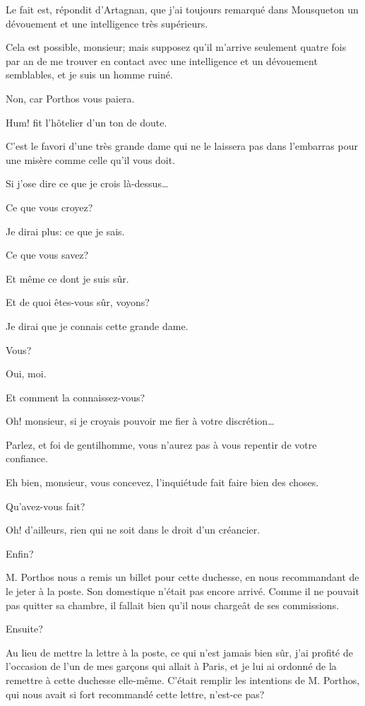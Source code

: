 \speak  Le fait est, répondit d'Artagnan, que j'ai toujours remarqué dans Mousqueton un dévouement et une intelligence très supérieurs. 

\speak  Cela est possible, monsieur; mais supposez qu'il m'arrive seulement quatre fois par an de me trouver en contact avec une intelligence et un dévouement semblables, et je suis un homme ruiné. 

\speak  Non, car Porthos vous paiera. 

\speak  Hum! fit l'hôtelier d'un ton de doute. 

\speak  C'est le favori d'une très grande dame qui ne le laissera pas dans l'embarras pour une misère comme celle qu'il vous doit. 

\speak  Si j'ose dire ce que je crois là-dessus\dots 

\speak  Ce que vous croyez? 

\speak  Je dirai plus: ce que je sais. 

\speak  Ce que vous savez? 

\speak  Et même ce dont je suis sûr. 

\speak  Et de quoi êtes-vous sûr, voyons? 

\speak  Je dirai que je connais cette grande dame. 

\speak  Vous? 

\speak  Oui, moi. 

\speak  Et comment la connaissez-vous? 

\speak  Oh! monsieur, si je croyais pouvoir me fier à votre discrétion\dots 

\speak  Parlez, et foi de gentilhomme, vous n'aurez pas à vous repentir de votre confiance. 

\speak  Eh bien, monsieur, vous concevez, l'inquiétude fait faire bien des choses. 

\speak  Qu'avez-vous fait? 

\speak  Oh! d'ailleurs, rien qui ne soit dans le droit d'un créancier. 

\speak  Enfin? 

\speak  M. Porthos nous a remis un billet pour cette duchesse, en nous recommandant de le jeter à la poste. Son domestique n'était pas encore arrivé. Comme il ne pouvait pas quitter sa chambre, il fallait bien qu'il nous chargeât de ses commissions. 

\speak  Ensuite? 

\speak  Au lieu de mettre la lettre à la poste, ce qui n'est jamais bien sûr, j'ai profité de l'occasion de l'un de mes garçons qui allait à Paris, et je lui ai ordonné de la remettre à cette duchesse elle-même. C'était remplir les intentions de M. Porthos, qui nous avait si fort recommandé cette lettre, n'est-ce pas? 

